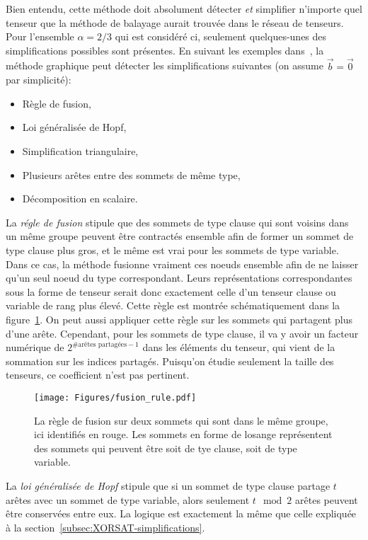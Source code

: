 Bien entendu, cette méthode doit absolument détecter \emph{et} simplifier n'importe quel tenseur que la méthode de balayage aurait trouvée dans le réseau de tenseurs.
Pour l'ensemble $\alpha = 2/3$ qui est considéré ci, seulement quelques-unes des simplifications possibles sont présentes.
En suivant les exemples dans~\cite{denny_algebraically_2012}, la méthode graphique peut détecter les simplifications suivantes (on assume $\vec{b} = \vec{0}$ par simplicité):
\begin{itemize}
    \item Règle de fusion,
    \item Loi généralisée de Hopf,
    \item Simplification triangulaire,
    \item Plusieurs arêtes entre des sommets de même type,
    \item Décomposition en scalaire.
\end{itemize}

La \emph{régle de fusion} stipule que des sommets de type clause qui sont voisins dans un même groupe peuvent être contractés ensemble afin de former un sommet de type clause plus gros, et le même est vrai pour les sommets de type variable.
Dans ce cas, la méthode fusionne vraiment ces noeuds ensemble afin de ne laisser qu'un seul noeud du type correspondant.
Leurs représentations correspondantes sous la forme de tenseur serait donc exactement celle d'un tenseur clause ou variable de rang plus élevé.
Cette règle est montrée schématiquement dans la figure~\ref{fig:fusion_rule}.
On peut aussi appliquer cette règle sur les sommets qui partagent plus d'une arête.
Cependant, pour les sommets de type clause, il va y avoir un facteur numérique de $2^{\#\text{arêtes partagées} - 1}$ dans les éléments du tenseur, qui vient de la sommation sur les indices partagés.
Puisqu'on étudie seulement la taille des tenseurs, ce coefficient n'est pas pertinent.
\begin{figure}[h]
    \centering
    \texttt{[image: Figures/fusion\_rule.pdf]}
    \caption[Représentation graphique de la règle de fusion sur deux sommets qui sont dans le même groupe.]{La règle de fusion sur deux sommets qui sont dans le même groupe, ici identifiés en rouge. Les sommets en forme de losange représentent des sommets qui peuvent être soit de tye clause, soit de type variable.}
    \label{fig:fusion_rule}
\end{figure}

La \emph{loi généralisée de Hopf} stipule que si un sommet de type clause partage $t$ arêtes avec un sommet de type variable, alors seulement $t \mod{2}$ arêtes peuvent être conservées entre eux.
La logique est exactement la même que celle expliquée à la section~\ref{subsec:XORSAT-simplifications}.

